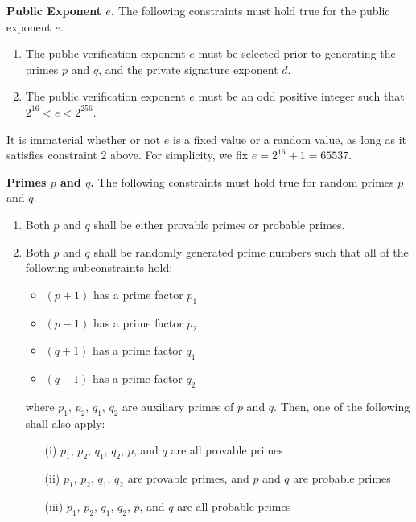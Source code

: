\documentclass[a4paper]{article}
\begin{document}
\noindent \textbf{Public Exponent $e$.} The following constraints must hold true for the public exponent $e$.
\begin{enumerate}
    \item The public verification exponent $e$ must be selected prior to generating the primes $p$ and $q$, and the private signature exponent $d$.

    \item The public verification exponent $e$ must be an odd positive integer such that $2^{16} < e < 2^{256}$.

\end{enumerate}

It is immaterial whether or not $e$ is a fixed value or a random value, as long as it satisfies constraint 2 above. For simplicity, we fix $e = 2^{16} + 1 = 65537$.\newline

\noindent \textbf{Primes $p$ and $q$.} The following constraints must hold true for random primes $p$ and $q$.

\begin{enumerate}
    \item Both $p$ and $q$ shall be either provable primes or probable primes.

    \item Both $p$ and $q$ shall be randomly generated prime numbers such that all of the following subconstraints hold:

        \begin{itemize}
            \item $(p+1)$ has a prime factor $p_1$
            \item $(p-1)$ has a prime factor $p_2$
            \item $(q+1)$ has a prime factor $q_1$
            \item $(q-1)$ has a prime factor $q_2$
        \end{itemize}

    where $p_1$, $p_2$, $q_1$, $q_2$ are auxiliary primes of $p$ and $q$. Then, one of the following shall also apply:

    \begin{enumerate}
        \item[(i)] $p_1$, $p_2$, $q_1$, $q_2$, $p$, and $q$ are all provable primes

        \item[(ii)] $p_1$, $p_2$, $q_1$, $q_2$ are provable primes, and $p$ and $q$ are probable primes
        \item[(iii)] $p_1$, $p_2$, $q_1$, $q_2$, $p$, and $q$ are all probable primes
    \end{enumerate}
\end{enumerate}
\end{document}
